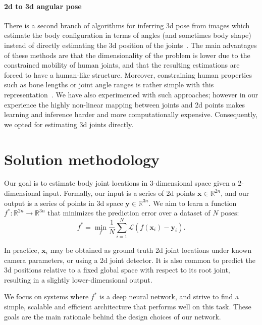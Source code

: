 \documentclass[10pt,twocolumn,letterpaper]{article}
\begin{document}
\paragraph{2d to 3d angular pose}
There is a second branch of algorithms for inferring 3d pose from images which estimate the body configuration in terms of angles (and sometimes body shape) instead of directly estimating the 3d position of the joints~\cite{barron_2001,ParameswaranC04,keep-it-simpl,zhou2016deep}. The main advantages of these methods are that the dimensionality of the problem is lower due to the constrained mobility of human joints, and that the resulting estimations are forced to have a human-like structure.
Moreover, constraining human properties such as bone lengths or joint angle
ranges is rather simple with this representation~\cite{WeiC09}.
We have also experimented with such approaches; however in our experience the highly non-linear mapping between joints and 2d points makes learning and inference harder and more computationally expensive. Consequently, we opted for estimating 3d joints directly.

\section{Solution methodology}

Our goal is to estimate body joint locations in 3-dimensional space given a 2-dimensional input. Formally, our input is a series of 2d points $\mathbf{x} \in \mathbb{R}^{2n}$, and our output is a series of points in 3d space $\mathbf{y} \in \mathbb{R}^{3n}$. We aim to learn a function $f^*: \mathbb{R}^{2n} \rightarrow \mathbb{R}^{3n}$ that minimizes the prediction error over a dataset of $N$ poses:
\begin{equation}
  f^* = \min_f \frac{1}{N} \sum_{i=1}^{N} \mathcal{L} \left( f(\mathbf{x}_i) -  \mathbf{y}_i \right).
\end{equation}

In practice, $\mathbf{x}_i$ may be obtained as ground truth 2d joint locations under known camera parameters, or using a 2d joint detector. It is also common to predict the 3d positions relative to a fixed global space with respect to its root joint, resulting in a slightly lower-dimensional output.


We focus on systems where $f^*$ is a deep neural network, and strive to find a simple, scalable and efficient architecture that performs well on this task. These goals are the main rationale behind the design choices of our network.
\end{document}
